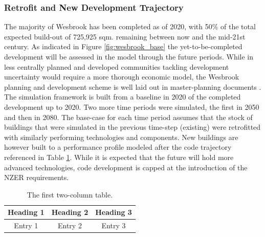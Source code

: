 \documentclass[twocolumn, a4paper,10pt]{article}
\begin{document}
\subsubsection*{Retrofit and New Development Trajectory}
The majority of Wesbrook has been completed as of 2020, with 50\% of the total expected build-out of 725,925 sqm. remaining between now and the mid-21st century. As indicated in Figure \ref{fig:wesbrook_base} the yet-to-be-completed development will be assessed in the model through the future periods. While in less centrally planned and developed communities tackling development uncertainty would require a more thorough economic model, the Wesbrook planning and development scheme is well laid out in master-planning documents \citep{Wesbrook masterplan}. The simulation framework is built from a baseline in 2020 of the completed development up to 2020. Two more time periods were simulated, the first in 2050 and then in 2080. The base-case for each time period assumes that the stock of buildings that were simulated in the previous time-step (existing) were retrofitted with similarly performing technologies and components. New buildings are however built to a performance profile modeled after the code trajectory referenced in Table \ref{tab:code_trajectory}. While it is expected that the future will hold more advanced technologies, code development is capped at the introduction of the NZER requirements.

\begin{table}[h]
    \vspace{-5pt}   %
    \caption{The first two-column table.}
    \label{tab:code_trajectory}
    \centering
    \begin{tabular}{ | c | c | c | }
        \hline
        \bf{Heading 1} & \bf{Heading} 2 & \bf{Heading 3} \\
        \hline
        Entry 1 & Entry 2 & Entry 3 \\
        \hline
    \end{tabular}
    \vspace{-5pt}   %
\end{table}
\end{document}
